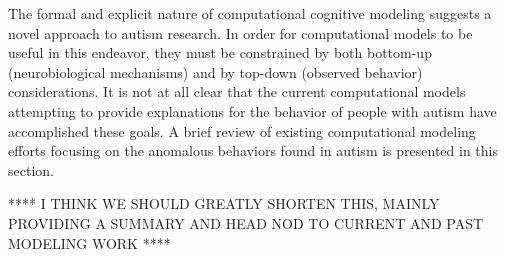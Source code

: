 \documentclass[man]{apa}
\begin{document}
The formal and explicit nature of computational cognitive modeling suggests a novel approach to autism research.  In order for computational models to be useful in this endeavor, they must be constrained by both bottom-up (neurobiological mechanisms) and by top-down (observed behavior) considerations.  It is not at all clear that the current computational models attempting to provide explanations for the behavior of people with autism have accomplished these goals.  A brief review of existing computational modeling efforts focusing on the anomalous behaviors found in autism is presented in this section. 

**** I THINK WE SHOULD GREATLY SHORTEN THIS, MAINLY PROVIDING A SUMMARY AND HEAD NOD TO CURRENT AND PAST MODELING WORK ****


\end{document}
